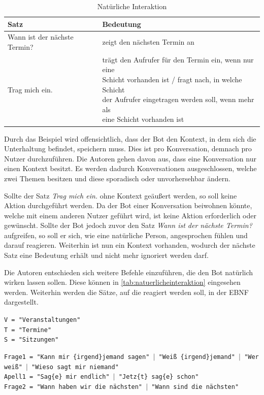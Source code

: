 \begin{table}[H]
\centering
\begin{tabular}{|l|l|}
\hline
\textbf{Satz} & \textbf{Bedeutung }\\
 \hline
Wann ist der nächste Termin? & zeigt den nächsten Termin an \\
\hline
Trag mich ein. & \makecell{trägt den Aufrufer für den Termin ein, wenn nur eine\\ Schicht vorhanden ist / fragt nach, in welche Schicht\\ der Aufrufer eingetragen werden soll, wenn mehr als\\ eine Schicht vorhanden ist} \\
\hline
\end{tabular}
\caption{Natürliche Interaktion}
\label{tab:satzinteraktion}
\end{table}

Durch das Beispiel wird offensichtlich, dass der Bot den Kontext, in dem sich die Unterhaltung befindet, speichern muss. Dies ist pro Konversation, demnach pro Nutzer durchzuführen. Die Autoren gehen davon aus, dass eine Konversation nur einen Kontext besitzt. Es werden dadurch Konversationen ausgeschlossen, welche zwei Themen besitzen und diese sporadisch oder unvorhersehbar ändern.

Sollte der Satz \textit{Trag mich ein.} ohne Kontext geäußert werden, so soll keine Aktion durchgeführt werden. Da der Bot einer Konversation beiwohnen könnte, welche mit einem anderen Nutzer geführt wird, ist keine Aktion erforderlich oder gewünscht. Sollte der Bot jedoch zuvor den Satz \textit{Wann ist der nächste Termin?} aufgreifen, so soll er sich, wie eine natürliche Person, angesprochen fühlen und darauf reagieren. Weiterhin ist nun ein Kontext vorhanden, wodurch der nächste Satz eine Bedeutung erhält und nicht mehr ignoriert werden darf.


Die Autoren entschieden sich weitere Befehle einzuführen, die den Bot natürlich wirken lassen sollen. Diese können in \autoref{tab:natuerlicheinteraktion} eingesehen werden. Weiterhin werden die Sätze, auf die reagiert werden soll, in der EBNF dargestellt.

\texttt{V = "Veranstaltungen"}\\
\texttt{T = "Termine"}\\
\texttt{S = "{}Sitzungen"}

\texttt{Frage1 = "Kann mir \{irgend\}jemand sagen" $|$ "Weiß \{irgend\}jemand" $|$ "Wer weiß" $|$ "Wieso sagt mir niemand"}\\
\texttt{Apell1 = "{}Sag\{e\} mir endlich" $|$ "Jetz\{t\} sag\{e\} schon"}\\
\texttt{Frage2 = "Wann haben wir die nächsten" $|$ "Wann sind die nächsten"}

